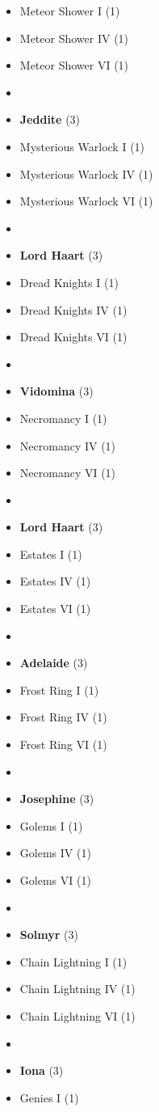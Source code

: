 \begin{multicols}{3}
\begin{itemize}[leftmargin=0pt, label={}, noitemsep]
  \item Meteor Shower I (1)
  \item Meteor Shower IV (1)
  \item Meteor Shower VI (1)
  \item
  \item \textbf{Jeddite} (3)
  \item Mysterious Warlock I (1)
  \item Mysterious Warlock IV (1)
  \item Mysterious Warlock VI (1)
  \item
  \item \textbf{Lord Haart} (3)
  \item Dread Knights I (1)
  \item Dread Knights IV (1)
  \item Dread Knights VI (1)
  \item
  \item \textbf{Vidomina} (3)
  \item Necromancy I (1)
  \item Necromancy IV (1)
  \item Necromancy VI (1)
  \item
  \item \textbf{Lord Haart} (3)
  \item Estates I (1)
  \item Estates IV (1)
  \item Estates VI (1)
  \item
  \item \textbf{Adelaide} (3)
  \item Frost Ring I (1)
  \item Frost Ring IV (1)
  \item Frost Ring VI (1)
  \item
  \item \textbf{Josephine} (3)
  \item Golems I (1)
  \item Golems IV (1)
  \item Golems VI (1)
  \item
  \item \textbf{Solmyr} (3)
  \item Chain Lightning I (1)
  \item Chain Lightning IV (1)
  \item Chain Lightning VI (1)
  \item
  \item \textbf{Iona} (3)
  \item Genies I (1)

\end{itemize}
\end{multicols}
